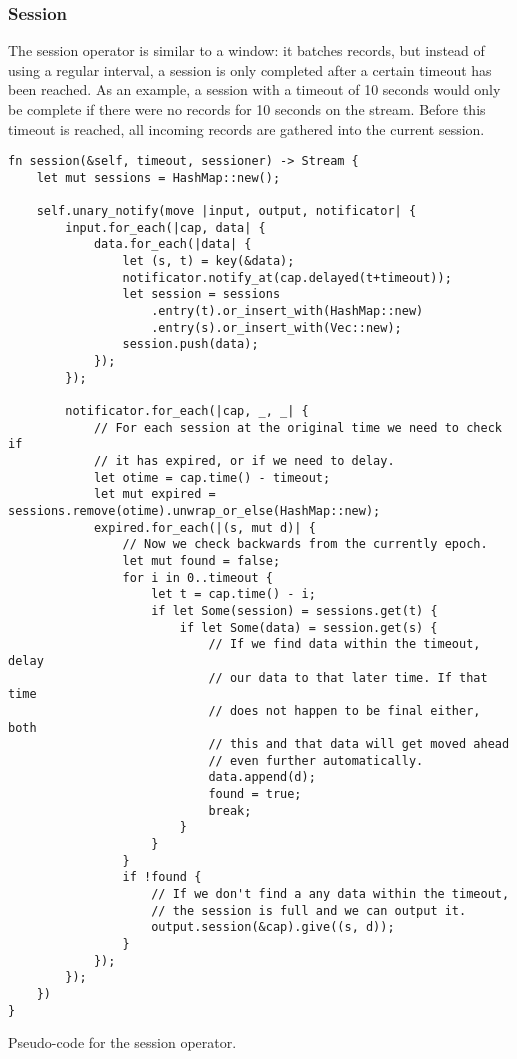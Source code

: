 \subsubsection{Session}
The session operator is similar to a window: it batches records, but instead of using a regular interval, a session is only completed after a certain timeout has been reached. As an example, a session with a timeout of 10 seconds would only be complete if there were no records for 10 seconds on the stream. Before this timeout is reached, all incoming records are gathered into the current session.

\begin{listing}[H]
\begin{verbatim}
fn session(&self, timeout, sessioner) -> Stream {
    let mut sessions = HashMap::new();
    
    self.unary_notify(move |input, output, notificator| {
        input.for_each(|cap, data| {
            data.for_each(|data| {
                let (s, t) = key(&data);
                notificator.notify_at(cap.delayed(t+timeout));
                let session = sessions
                    .entry(t).or_insert_with(HashMap::new)
                    .entry(s).or_insert_with(Vec::new);
                session.push(data);
            });
        });
        
        notificator.for_each(|cap, _, _| {
            // For each session at the original time we need to check if
            // it has expired, or if we need to delay.
            let otime = cap.time() - timeout;
            let mut expired = sessions.remove(otime).unwrap_or_else(HashMap::new);
            expired.for_each(|(s, mut d)| {
                // Now we check backwards from the currently epoch.
                let mut found = false;
                for i in 0..timeout {
                    let t = cap.time() - i;
                    if let Some(session) = sessions.get(t) {
                        if let Some(data) = session.get(s) {
                            // If we find data within the timeout, delay
                            // our data to that later time. If that time
                            // does not happen to be final either, both
                            // this and that data will get moved ahead
                            // even further automatically.
                            data.append(d);
                            found = true;
                            break;
                        }
                    }
                }
                if !found {
                    // If we don't find a any data within the timeout,
                    // the session is full and we can output it.
                    output.session(&cap).give((s, d));
                }
            });
        });
    })
}
\end{verbatim}
  \caption{Pseudo-code for the session operator.}
  \label{lst:session}
\end{listing}

